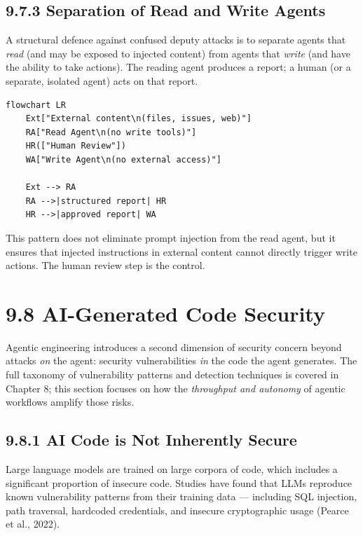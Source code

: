 \documentclass[11pt,a4paper]{book}
\begin{document}
\subsection{9.7.3 Separation of Read and Write Agents}

A structural defence against confused deputy attacks is to separate agents that \textit{read} (and may be exposed to injected content) from agents that \textit{write} (and have the ability to take actions). The reading agent produces a report; a human (or a separate, isolated agent) acts on that report.

\begin{lstlisting}
flowchart LR
    Ext["External content\n(files, issues, web)"]
    RA["Read Agent\n(no write tools)"]
    HR(["Human Review"])
    WA["Write Agent\n(no external access)"]

    Ext --> RA
    RA -->|structured report| HR
    HR -->|approved report| WA
\end{lstlisting}

This pattern does not eliminate prompt injection from the read agent, but it ensures that injected instructions in external content cannot directly trigger write actions. The human review step is the control.

\medskip

\section{9.8 AI-Generated Code Security}

Agentic engineering introduces a second dimension of security concern beyond attacks \textit{on} the agent: security vulnerabilities \textit{in} the code the agent generates. The full taxonomy of vulnerability patterns and detection techniques is covered in Chapter 8; this section focuses on how the \textit{throughput and autonomy} of agentic workflows amplify those risks.

\subsection{9.8.1 AI Code is Not Inherently Secure}

Large language models are trained on large corpora of code, which includes a significant proportion of insecure code. Studies have found that LLMs reproduce known vulnerability patterns from their training data --- including SQL injection, path traversal, hardcoded credentials, and insecure cryptographic usage (Pearce et al., 2022).
\end{document}
